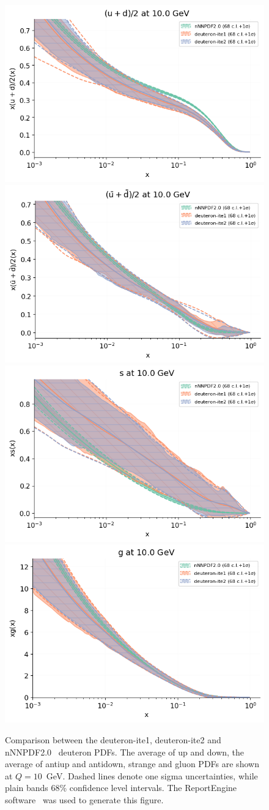 \documentclass[11pt,a4paper]{article}
\begin{document}
\begin{figure}[!t]
\centering
\includegraphics[width=0.49\linewidth]{plots/deuteron_pdf_u.png}
\includegraphics[width=0.49\linewidth]{plots/deuteron_pdf_ubar.png}\\
\includegraphics[width=0.49\linewidth]{plots/deuteron_pdf_s.png}
\includegraphics[width=0.49\linewidth]{plots/deuteron_pdf_g.png}\\
\caption{Comparison between the deuteron-ite1, deuteron-ite2 and nNNPDF2.0~\cite{AbdulKhalek:2020yuc}
  deuteron PDFs. The average of up and down, the average of antiup and antidown,
  strange and gluon PDFs are shown at $Q=10$~GeV.  Dashed lines denote one
  sigma uncertainties, while plain bands 68\% confidence level intervals.
  The {\sc ReportEngine} software~\cite{zahari_kassabov_2019_2571601}
  was used to generate this figure.}
\label{fig:deuteron_pdfs}
\end{figure}
\end{document}
